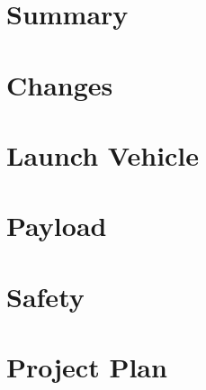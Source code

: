 \documentclass[11pt, letterpaper,oneside]{memoir}
\numberwithin{equation}{section}
\theoremstyle{definition}
\begin{document}
	\listoftables
	
	\clearpage
	
	
	
	\printglossary[type=\acronymtype]
	
	\newpage

	\tableofcontents
	
	
	
	\part{Summary}
	
	\part{Changes}
	
	\part{Launch Vehicle}
	
	\part{Payload}
	
	
	
	\part{Safety}
	
	\part{Project Plan}
 	
	
	
\end{document}
